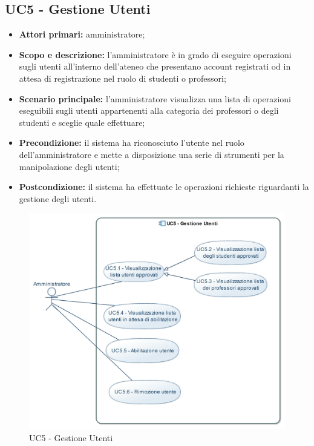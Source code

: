\documentclass[AnalisiDeiRequisiti.tex]{subfiles}
\begin{document}
\subsection{UC5 - Gestione Utenti}
\begin{itemize}
	\item \textbf{Attori primari:} amministratore;
	\item \textbf{Scopo e descrizione:} l'amministratore è in grado di eseguire operazioni sugli utenti all'interno dell'ateneo che presentano account registrati od in attesa di registrazione nel ruolo di studenti o professori;
	\item \textbf{Scenario principale:} l'amministratore visualizza una lista di operazioni eseguibili sugli utenti appartenenti alla categoria dei professori o degli studenti e sceglie quale effettuare;
	\item \textbf{Precondizione:} il sistema ha riconosciuto l'utente nel ruolo dell'amministratore e mette a disposizione una serie di strumenti per la manipolazione degli utenti; 
	\item \textbf{Postcondizione:} il sistema ha effettuate le operazioni richieste riguardanti la gestione degli utenti.
\end{itemize}
\begin{figure}[H]
	\centering
	\includegraphics[width=0.8\linewidth]{UC5.jpg}
	\caption{UC5 - Gestione Utenti}
	\label{fig:UC5 - Gestione Utenti}
\end{figure}
\end{document}
